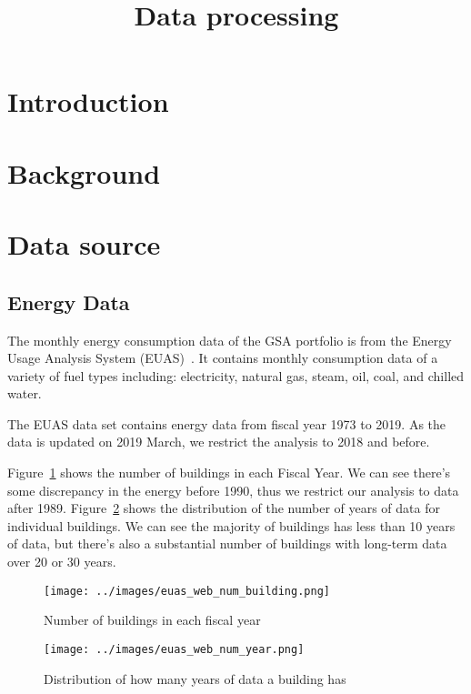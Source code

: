 \documentclass[12pt]{article}
\newcommand{\fref}[1]{Figure~\ref{#1}}
\begin{document}
\title{Data processing}
\maketitle
\tableofcontents
\newpage
\section{Introduction}
\section{Background}
\section{Data source}
\subsection{Energy Data} The monthly energy consumption data of the GSA
portfolio is from the Energy Usage Analysis System (EUAS)~\cite{euas2019}. It
contains monthly consumption data of a variety of fuel types including:
electricity, natural gas, steam, oil, coal, and chilled water. 
                                    
The EUAS data set contains energy data from fiscal year 1973 to 2019. As the
data is updated on 2019 March, we restrict the analysis to 2018 and before.

\fref{fig:euas_web_num_building} shows the number of buildings in each Fiscal
Year. We can see there's some discrepancy in the energy before 1990, thus we
restrict our analysis to data after 1989. \fref{fig:euas_web_num_year} shows the
distribution of the number of years of data for individual buildings. We can see
the majority of buildings has less than 10 years of data, but there's also a
substantial number of buildings with long-term data over 20 or 30 years.

\begin{figure}[H]
  \centering
  \texttt{[image: ../images/euas\_web\_num\_building.png]}
  \caption{Number of buildings in each fiscal year}
  \label{fig:euas_web_num_building}
\end{figure}

\begin{figure}[H]
  \centering
  \texttt{[image: ../images/euas\_web\_num\_year.png]}
  \caption{Distribution of how many years of data a building has}
  \label{fig:euas_web_num_year}
\end{figure}
\end{document}
